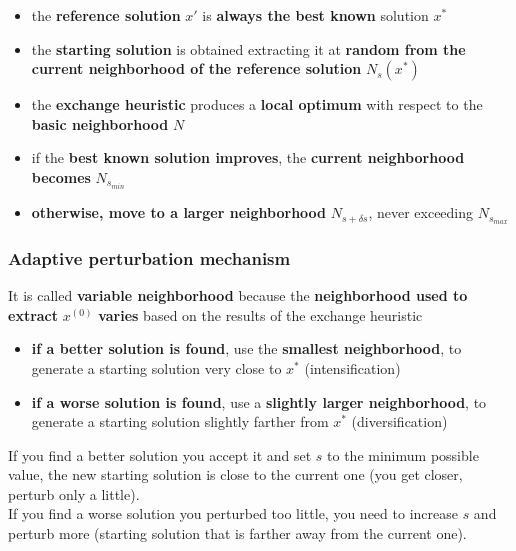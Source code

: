 \documentclass[11pt]{article}
\begin{document}
	\begin{itemize}
		\item the \textbf{reference solution} $x'$ is \textbf{always the best known} solution $x^\ast$
		
		\item the \textbf{starting solution} is obtained extracting it at \textbf{random from the current neighborhood of the reference solution} $N_s (x^\ast)$
		
		\item the \textbf{exchange heuristic} produces a \textbf{local optimum} with respect to the \textbf{basic neighborhood} $N$
		
		\item if the \textbf{best known solution improves}, the \textbf{current neighborhood becomes} $N_{s_{min}}$
		
		\item \textbf{otherwise, move to a larger neighborhood} $N_{s+\delta s}$, never exceeding $N_{s_{max}}$
	\end{itemize}
	
	\newpage
	
	\subsubsection{Adaptive perturbation mechanism}
	It is called \textbf{variable neighborhood} because the \textbf{neighborhood used to extract} $x^{(0)}$ \textbf{varies} based on the results of the exchange heuristic
	\begin{itemize}
		\item \textbf{if a better solution is found}, use the \textbf{smallest neighborhood}, to generate a starting solution very close to $x^\ast$ (intensification)
		
		\item \textbf{if a worse solution is found}, use a \textbf{slightly larger neighborhood}, to generate a starting solution slightly farther from $x^\ast$ (diversification)
	\end{itemize}
	
	If you find a better solution you accept it and set $s$ to the minimum possible value, the new starting solution is close to the current one (you get closer, perturb only a little).\\
	If you find a worse solution you perturbed too little, you need to increase $s$ and perturb more (starting solution that is farther away from the current one).\\
	
\end{document}
